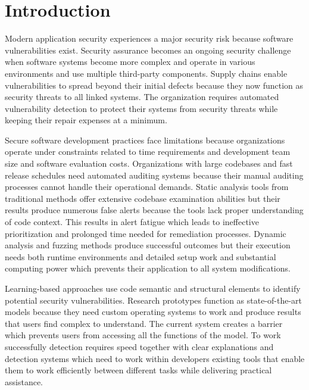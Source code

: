 \clearpage

\hypersetup{linkcolor=black}
\tableofcontents %
\hypersetup{linkcolor=blue}
\renewcommand\arraystretch{1}

\mainmatter %
\pagestyle{thesis} %

\chapter{Introduction}
\label{ch:introduction}

Modern application security experiences a major security risk because software vulnerabilities exist. Security assurance becomes an ongoing security challenge when software systems become more complex and operate in various environments and use multiple third-party components. Supply chains enable vulnerabilities to spread beyond their initial defects because they now function as security threats to all linked systems. The organization requires automated vulnerability detection to protect their systems from security threats while keeping their repair expenses at a minimum.

Secure software development practices face limitations because organizations operate under constraints related to time requirements and development team size and software evaluation costs. Organizations with large codebases and fast release schedules need automated auditing systems because their manual auditing processes cannot handle their operational demands. Static analysis tools from traditional methods offer extensive codebase examination abilities but their results produce numerous false alerts because the tools lack proper understanding of code context. This results in alert fatigue which leads to ineffective prioritization and prolonged time needed for remediation processes. Dynamic analysis and fuzzing methods produce successful outcomes but their execution needs both runtime environments and detailed setup work and substantial computing power which prevents their application to all system modifications.

Learning-based approaches use code semantic and structural elements to identify potential security vulnerabilities. Research prototypes function as state-of-the-art models because they need custom operating systems to work and produce results that users find complex to understand. The current system creates a barrier which prevents users from accessing all the functions of the model. To work successfully detection requires speed together with clear explanations and detection systems which need to work within developers existing tools that enable them to work efficiently between different tasks while delivering practical assistance.

